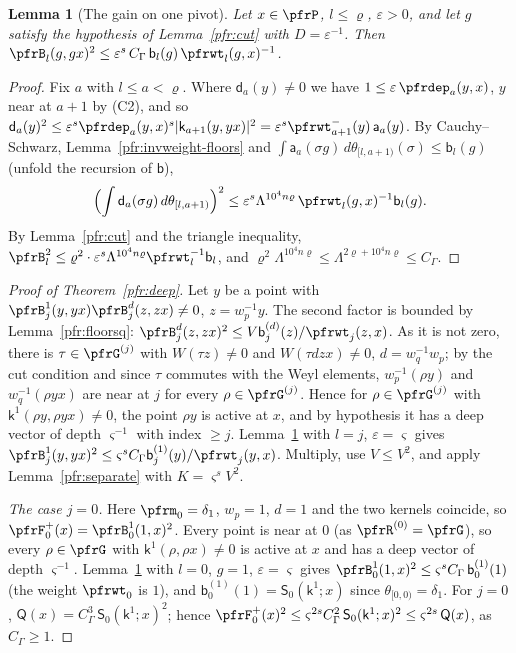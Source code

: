 \documentclass[10pt]{amsart}
\newtheorem{lemma}[theorem]{Lemma}
\theoremstyle{definition}
\theoremstyle{remark}
\begin{document}
\begin{lemma}[The gain on one pivot]\label{pfr:pivotdeep}
Let $x\in\pfrP$, $l\le\varrho$, $\varepsilon>0$, and let $g$ satisfy the hypothesis of
Lemma~\ref{pfr:cut} with $D=\varepsilon^{-1}$. Then
$\pfrB_l(g,gx)^2\le\varepsilon^{s}\,C_\Gamma\,\mathsf b_l(g)\,\pfrwt_l(g,x)^{-1}$.
\end{lemma}
\begin{proof}
Fix $a$ with $l\le a<\varrho$. Where $\mathsf d_a(y)\ne0$ we have $1\le\varepsilon\,\pfrdep_a(y,x)$, $y$ near
at $a+1$ by (C2), and so $\mathsf d_a(y)^2\le\varepsilon^s\pfrdep_a(y,x)^s|\mathsf k_{a+1}(y,yx)|^2=
\varepsilon^s\pfrwt^-_{a+1}(y)\,\mathsf a_a(y)$. By Cauchy--Schwarz, Lemma~\ref{pfr:invweight-floors} and
$\int\mathsf a_a(\sigma g)\,d\theta_{[l,a+1)}(\sigma)\le\mathsf b_l(g)$ (unfold the recursion of $\mathsf b$),
\[
\Bigl(\int\mathsf d_a(\sigma g)\,d\theta_{[l,a+1)}\Bigr)^2\le\varepsilon^s\Lambda^{10^4n\varrho}\,\pfrwt_l(g,x)^{-1}\mathsf b_l(g).
\]
By Lemma~\ref{pfr:cut} and the triangle inequality, $\pfrB_l^2\le\varrho^2\cdot\varepsilon^s\Lambda^{10^4n\varrho}
\pfrwt_l^{-1}\mathsf b_l$, and $\varrho^2\Lambda^{10^4n\varrho}\le\Lambda^{2\varrho+10^4n\varrho}\le C_\Gamma$.
\end{proof}

\begin{proof}[Proof of Theorem~\ref{pfr:deep}]
Let $y$ be a point with $\pfrB^1_j(y,yx)\pfrB^d_j(z,zx)\ne0$, $z=w_p^{-1}y$. The second factor is
bounded by Lemma~\ref{pfr:floorsq}: $\pfrB^d_j(z,zx)^2\le V\mathsf b^{(d)}_j(z)/\pfrwt_j(z,x)$. As it is not
zero, there is $\tau\in\pfrG^{(j)}$ with $W(\tau z)\ne0$ and $W(\tau dzx)\ne0$, $d=w_q^{-1}w_p$; by the cut
condition and since $\tau$ commutes with the Weyl elements, $w_p^{-1}(\rho y)$ and $w_q^{-1}(\rho yx)$ are near
at $j$ for every $\rho\in\pfrG^{(j)}$. Hence for $\rho\in\pfrG^{(j)}$ with $\mathsf k^1(\rho y,\rho yx)\ne0$, the
point $\rho y$ is active at $x$, and by hypothesis it has a deep vector of depth $\varsigma^{-1}$ with index
$\ge j$. Lemma~\ref{pfr:pivotdeep} with $l=j$, $\varepsilon=\varsigma$ gives $\pfrB^1_j(y,yx)^2\le\varsigma^sC_\Gamma
\mathsf b^{(1)}_j(y)/\pfrwt_j(y,x)$. Multiply, use $V\le V^2$, and apply Lemma~\ref{pfr:separate} with
$K=\varsigma^sV^2$.

\emph{The case $j=0$.} Here $\pfrm_0=\delta_1$, $w_p=1$, $d=1$ and the two kernels coincide, so
$\pfrF^+_0(x)=\pfrB^1_0(1,x)^2$. Every point is near at $0$ (as $\pfrR^{(0)}=\pfrG$), so every $\rho\in\pfrG$ with
$\mathsf k^1(\rho,\rho x)\ne0$ is active at $x$ and has a deep vector of depth $\varsigma^{-1}$.
Lemma~\ref{pfr:pivotdeep} with $l=0$, $g=1$, $\varepsilon=\varsigma$ gives
$\pfrB^1_0(1,x)^2\le\varsigma^sC_\Gamma\,\mathsf b^{(1)}_0(1)$ (the weight $\pfrwt_0$ is $1$), and
$\mathsf b^{(1)}_0(1)=\mathsf S_0(\mathsf k^1;x)$ since $\theta_{[0,0)}=\delta_1$. For $j=0$,
$\mathsf Q(x)=C_\Gamma^3\,\mathsf S_0(\mathsf k^1;x)^2$; hence
$\pfrF^+_0(x)^2\le\varsigma^{2s}C_\Gamma^2\,\mathsf S_0(\mathsf k^1;x)^2\le\varsigma^{2s}\,\mathsf Q(x)$, as $C_\Gamma\ge1$.
\end{proof}
\end{document}
